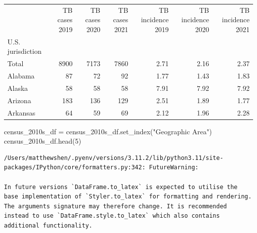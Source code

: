 \documentclass[
  letterpaper,
  DIV=11,
  numbers=noendperiod]{scrreprt}
\newenvironment{Shaded}{\begin{snugshade}}{\end{snugshade}}
\newcommand{\DecValTok}[1]{\textcolor[rgb]{0.68,0.00,0.00}{#1}}
\newcommand{\NormalTok}[1]{\textcolor[rgb]{0.00,0.23,0.31}{#1}}
\newcommand{\OperatorTok}[1]{\textcolor[rgb]{0.37,0.37,0.37}{#1}}
\newcommand{\StringTok}[1]{\textcolor[rgb]{0.13,0.47,0.30}{#1}}
\begin{document}
\begin{tabular}{lrrrrrr}
\toprule
{} &  TB cases 2019 &  TB cases 2020 &  TB cases 2021 &  TB incidence 2019 &  TB incidence 2020 &  TB incidence 2021 \\
U.S. jurisdiction &                &                &                &                    &                    &                    \\
\midrule
Total             &           8900 &           7173 &           7860 &               2.71 &               2.16 &               2.37 \\
Alabama           &             87 &             72 &             92 &               1.77 &               1.43 &               1.83 \\
Alaska            &             58 &             58 &             58 &               7.91 &               7.92 &               7.92 \\
Arizona           &            183 &            136 &            129 &               2.51 &               1.89 &               1.77 \\
Arkansas          &             64 &             59 &             69 &               2.12 &               1.96 &               2.28 \\
\bottomrule
\end{tabular}

\begin{Shaded}
\begin{Highlighting}[]
\NormalTok{census\_2010s\_df }\OperatorTok{=}\NormalTok{ census\_2010s\_df.set\_index(}\StringTok{"Geographic Area"}\NormalTok{)}
\NormalTok{census\_2010s\_df.head(}\DecValTok{5}\NormalTok{)}
\end{Highlighting}
\end{Shaded}

\begin{verbatim}
/Users/matthewshen/.pyenv/versions/3.11.2/lib/python3.11/site-packages/IPython/core/formatters.py:342: FutureWarning:

In future versions `DataFrame.to_latex` is expected to utilise the base implementation of `Styler.to_latex` for formatting and rendering. The arguments signature may therefore change. It is recommended instead to use `DataFrame.style.to_latex` which also contains additional functionality.
\end{verbatim}
\end{document}
